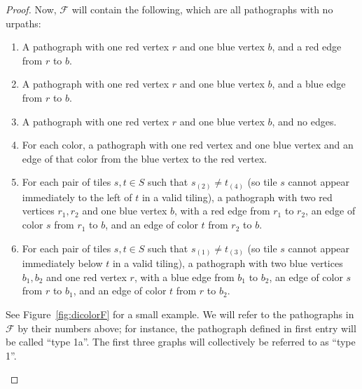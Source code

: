 \documentclass{article}
\newcommand{\cvert}[3]{\node[cdot={#3}] (#1) at (#2) {};}
\newcommand{\dicoledge}[3]{\draw[->, shorten >=4pt, color=#3] (#1) -- (#2);}
\newcommand{\Fc}{\mathcal{F}}
\begin{document}
\begin{proof}
Now, $\Fc$ will contain the following, which are all pathographs with no urpaths:
\begin{enumerate}[start=2]
    \item[1a.] A pathograph with one red vertex $r$ and one blue vertex $b$, and a red edge from $r$ to $b$.
    \item[1b.] A pathograph with one red vertex $r$ and one blue vertex $b$, and a blue edge from $r$ to $b$.
    \item[1c.] A pathograph with one red vertex $r$ and one blue vertex $b$, and no edges.
    \item[1d.] For each color, a pathograph with one red vertex and one blue vertex and an edge of that color from the blue vertex to the red vertex.
    \item For each pair of tiles $s,t\in S$ such that $s_{(2)}\ne t_{(4)}$ (so tile $s$ cannot appear immediately to the left of $t$ in a valid tiling), a pathograph with two red vertices $r_1,r_2$ and one blue vertex $b$, with a red edge from $r_1$ to $r_2$, an edge of color $s$ from $r_1$ to $b$, and an edge of color $t$ from $r_2$ to $b$.
    \item For each pair of tiles $s,t\in S$ such that $s_{(1)}\ne t_{(3)}$ (so tile $s$ cannot appear immediately below $t$ in a valid tiling), a pathograph with two blue vertices $b_1,b_2$ and one red vertex $r$, with a blue edge from $b_1$ to $b_2$, an edge of color $s$ from $r$ to $b_1$, and an edge of color $t$ from $r$ to $b_2$.
\end{enumerate}
See Figure~\ref{fig:dicolorF} for a small example. We will refer to the pathographs in $\Fc$ by their numbers above; for instance, the pathograph defined in first entry will be called ``type 1a''. The first three graphs will collectively be referred to as ``type 1''.

\begin{figure}[htbp!]
    \centering
\end{figure}
\end{proof}
\end{document}

